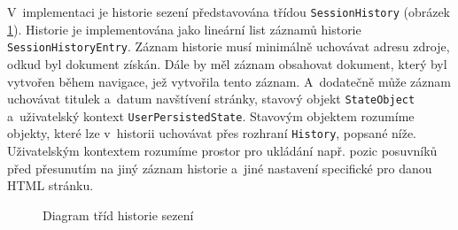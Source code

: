 \vspace{-1em}

V~implementaci je historie sezení představována třídou \texttt{SessionHistory} (obrázek \ref{Figure.SessionHistoryDiagram}). Historie je implementována jako lineární list záznamů historie \texttt{SessionHistoryEntry}. Záznam historie musí minimálně uchovávat adresu zdroje, odkud byl dokument získán. Dále by měl záznam obsahovat dokument, který byl vytvořen během navigace, jež vytvořila tento záznam. A~dodatečně může záznam uchovávat titulek a~datum navštívení stránky, stavový objekt \texttt{StateObject} a~uživatelský kontext \texttt{UserPersistedState}. Stavovým objektem rozumíme objekty, které lze v~historii uchovávat přes rozhraní \texttt{History}, popsané níže. Uživatelským kontextem rozumíme prostor pro ukládání např. pozic posuvníků před přesunutím na jiný záznam historie a~jiné nastavení specifické pro danou HTML stránku. 

\begin{figure}[H]
  \begin{center}
    \caption{Diagram tříd historie sezení}
    \label{Figure.SessionHistoryDiagram}
  \end{center}
\end{figure}

